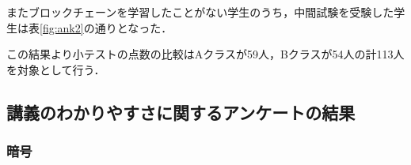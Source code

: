 \documentclass[a4j,12pt]{jsarticle}
\begin{document}
\begin{table}[H]
\centering
\caption{アンケート結果}

\label{fig:ank}
\end{table}

またブロックチェーンを学習したことがない学生のうち，中間試験を受験した学生は表\ref{fig:ank2}の通りとなった．

\begin{table}[H]
\centering
\caption{中間試験の受験状況}

\label{fig:ank2}
\end{table}

この結果より小テストの点数の比較はAクラスが59人，Bクラスが54人の計113人を対象として行う．

\newpage
\subsection{講義のわかりやすさに関するアンケートの結果}
\subsubsection{暗号}
\end{document}
